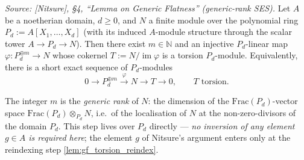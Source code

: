 \begin{lemma}


  \label{lem:gf_generic_rank_ses}
  \textit{Source: [Nitsure], \S4, ``Lemma on Generic Flatness'' (generic-rank SES).}
  Let \(A\) be a noetherian domain, \(d \ge 0\), and \(N\) a finite module over the
  polynomial ring \(P_d := A[X_1, \dots, X_d]\) (with its induced \(A\)-module structure
  through the scalar tower \(A \to P_d \to N\)). Then there exist \(m \in \mathbb{N}\) and
  an injective \(P_d\)-linear map \(\varphi : P_d^{\oplus m} \to N\) whose cokernel
  \(T := N / \operatorname{im}\varphi\) is a torsion \(P_d\)-module. Equivalently, there is
  a short exact sequence of \(P_d\)-modules
  \[
    0 \to P_d^{\oplus m} \xrightarrow{\ \varphi\ } N \to T \to 0,
    \qquad T \text{ torsion}.
  \]

  The integer \(m\) is the \emph{generic rank} of \(N\): the dimension of the
  \(\mathrm{Frac}(P_d)\)-vector space
  \(\mathrm{Frac}(P_d) \otimes_{P_d} N\), i.e.\ of the localisation of \(N\) at the
  non-zero-divisors of the domain \(P_d\). This step lives over \(P_d\) directly —
  \emph{no inversion of any element \(g \in A\) is required here}; the element \(g\) of
  Nitsure's argument enters only at the reindexing step \cref{lem:gf_torsion_reindex}.
\end{lemma}

